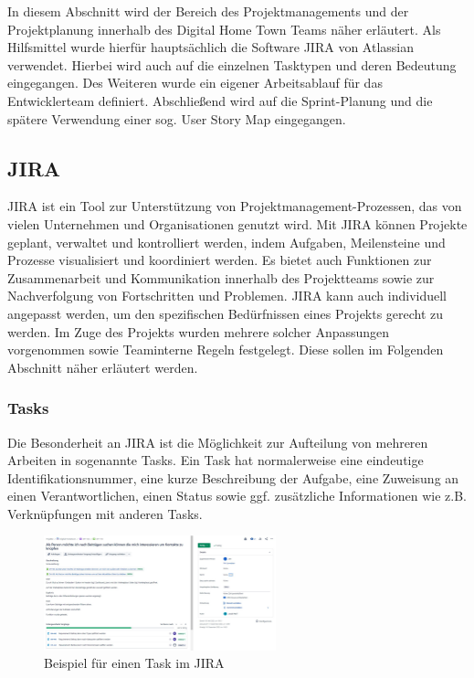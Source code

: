 
In diesem Abschnitt wird der Bereich des Projektmanagements und der Projektplanung innerhalb des Digital Home Town Teams näher erläutert. Als Hilfsmittel wurde hierfür hauptsächlich die Software JIRA von Atlassian verwendet. Hierbei wird auch auf die einzelnen Tasktypen und deren Bedeutung eingegangen. Des Weiteren wurde ein eigener Arbeitsablauf für das Entwicklerteam definiert. Abschließend wird auf die Sprint-Planung und die spätere Verwendung einer sog. User Story Map eingegangen.

\subsection{JIRA}
JIRA ist ein Tool zur Unterstützung von Projektmanagement-Prozessen, das von vielen Unternehmen und Organisationen genutzt wird. Mit JIRA können Projekte geplant, verwaltet und kontrolliert werden, indem Aufgaben, Meilensteine und Prozesse visualisiert und koordiniert werden. Es bietet auch Funktionen zur Zusammenarbeit und Kommunikation innerhalb des Projektteams sowie zur Nachverfolgung von Fortschritten und Problemen. JIRA kann auch individuell angepasst werden, um den spezifischen Bedürfnissen eines Projekts gerecht zu werden. Im Zuge des Projekts wurden mehrere solcher Anpassungen vorgenommen sowie Teaminterne Regeln festgelegt. Diese sollen im Folgenden Abschnitt näher erläutert werden.

\subsubsection{Tasks}
Die Besonderheit an JIRA ist die Möglichkeit zur Aufteilung von mehreren Arbeiten in sogenannte Tasks. Ein Task hat normalerweise eine eindeutige Identifikationsnummer, eine kurze Beschreibung der Aufgabe, eine Zuweisung an einen Verantwortlichen, einen Status sowie ggf. zusätzliche Informationen wie z.B. Verknüpfungen mit anderen Tasks. 

\begin{figure}[ht!]
    \centering
    \includegraphics[width=0.6\textwidth]{figures/andre/jiratask.jpg}
    \caption{Beispiel für einen Task im JIRA}
    \label{fig:jiratask}
\end{figure}

